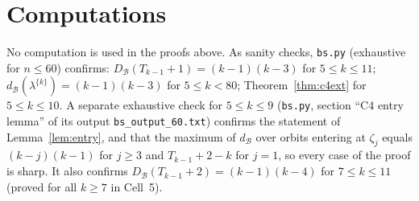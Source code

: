 \documentclass[11pt]{article}
\theoremstyle{definition}
\newcommand{\dB}{d_{\mathcal{B}}}
\newcommand{\DB}{D_{\mathcal{B}}}
\renewcommand{\le}{\leqslant}
\renewcommand{\ge}{\geqslant}
\begin{document}
\section{Computations}
No computation is used in the proofs above.  As sanity checks, \texttt{bs.py} (exhaustive for $n\le60$)
confirms: $\DB(T_{k-1}+1)=(k-1)(k-3)$ for $5\le k\le11$; $\dB(\lambda^{\{k\}})=(k-1)(k-3)$ for $5\le k<80$;
Theorem~\ref{thm:c4ext} for $5\le k\le10$.  A separate exhaustive check for $5\le k\le9$ (\texttt{bs.py}, section ``C4 entry lemma'' of its output
\texttt{bs\_output\_60.txt}) confirms the
statement of Lemma~\ref{lem:entry}, and that the maximum of $\dB$ over orbits entering at $\zeta_j$ equals
$(k-j)(k-1)$ for $j\ge3$ and $T_{k-1}+2-k$ for $j=1$, so every case of the proof is sharp.  It also confirms
$\DB(T_{k-1}+2)=(k-1)(k-4)$ for $7\le k\le11$ (proved for all $k\ge7$ in Cell~5).

\appendix
\end{document}

